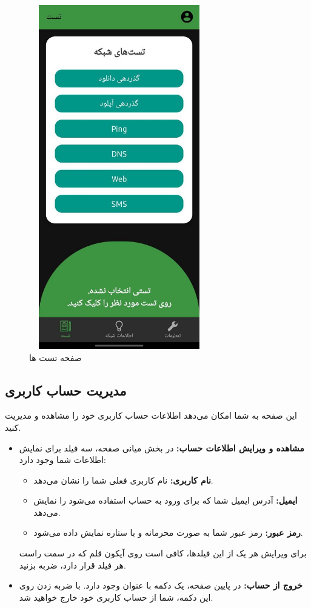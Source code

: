 \documentclass{report}
\begin{document}
 \begin{figure}[ht]
 	\centering
 	\includegraphics[width=0.7\textwidth,height=15cm,keepaspectratio]{Pic/test}
 	\caption{صفحه تست ها}
 	\label{fig:test}
 \end{figure}
\subsection{مدیریت حساب کاربری}

این صفحه به شما امکان می‌دهد اطلاعات حساب کاربری خود را مشاهده و مدیریت کنید.

\begin{itemize}
	\item \textbf{مشاهده و ویرایش اطلاعات حساب:}  
	در بخش میانی صفحه، سه فیلد برای نمایش اطلاعات شما وجود دارد:
	\begin{itemize}
		\item \textbf{نام کاربری:} نام کاربری فعلی شما را نشان می‌دهد.
		\item \textbf{ایمیل:} آدرس ایمیل شما که برای ورود به حساب استفاده می‌شود را نمایش می‌دهد.
		\item \textbf{رمز عبور:} رمز عبور شما به صورت محرمانه و با ستاره نمایش داده می‌شود.
	\end{itemize}
	برای ویرایش هر یک از این فیلدها، کافی است روی آیکون قلم که در سمت راست هر فیلد قرار دارد، ضربه بزنید.
	
	\item \textbf{خروج از حساب:}  
	در پایین صفحه، یک دکمه با عنوان  وجود دارد. با ضربه زدن روی این دکمه، شما از حساب کاربری خود خارج خواهید شد.
\end{itemize}
\end{document}
